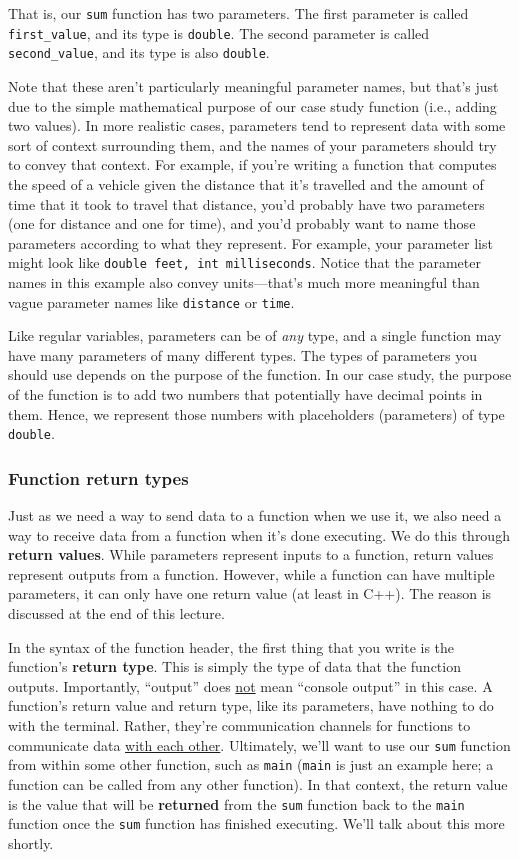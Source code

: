\documentclass{article}
\begin{document}
That is, our \texttt{sum} function has two parameters. The first parameter is called \texttt{first\_value}, and its type is \texttt{double}. The second parameter is called \texttt{second\_value}, and its type is also \texttt{double}.

Note that these aren't particularly meaningful parameter names, but that's just due to the simple mathematical purpose of our case study function (i.e., adding two values). In more realistic cases, parameters tend to represent data with some sort of context surrounding them, and the names of your parameters should try to convey that context. For example, if you're writing a function that computes the speed of a vehicle given the distance that it's travelled and the amount of time that it took to travel that distance, you'd probably have two parameters (one for distance and one for time), and you'd probably want to name those parameters according to what they represent. For example, your parameter list might look like \texttt{double feet, int milliseconds}. Notice that the parameter names in this example also convey units---that's much more meaningful than vague parameter names like \texttt{distance} or \texttt{time}.

Like regular variables, parameters can be of \textit{any} type, and a single function may have many parameters of many different types. The types of parameters you should use depends on the purpose of the function. In our case study, the purpose of the function is to add two numbers that potentially have decimal points in them. Hence, we represent those numbers with placeholders (parameters) of type \texttt{double}.

\subsubsection{Function return types}

Just as we need a way to send data to a function when we use it, we also need a way to receive data from a function when it's done executing. We do this through \textbf{return values}. While parameters represent inputs to a function, return values represent outputs from a function. However, while a function can have multiple parameters, it can only have one return value (at least in C++). The reason is discussed at the end of this lecture.

In the syntax of the function header, the first thing that you write is the function's \textbf{return type}. This is simply the type of data that the function outputs. Importantly, ``output'' does \ul{not} mean ``console output'' in this case. A function's return value and return type, like its parameters, have nothing to do with the terminal. Rather, they're communication channels for functions to communicate data \ul{with each other}. Ultimately, we'll want to use our \texttt{sum} function from within some other function, such as \texttt{main} (\texttt{main} is just an example here; a function can be called from any other function). In that context, the return value is the value that will be \textbf{returned} from the \texttt{sum} function back to the \texttt{main} function once the \texttt{sum} function has finished executing. We'll talk about this more shortly.
\end{document}
